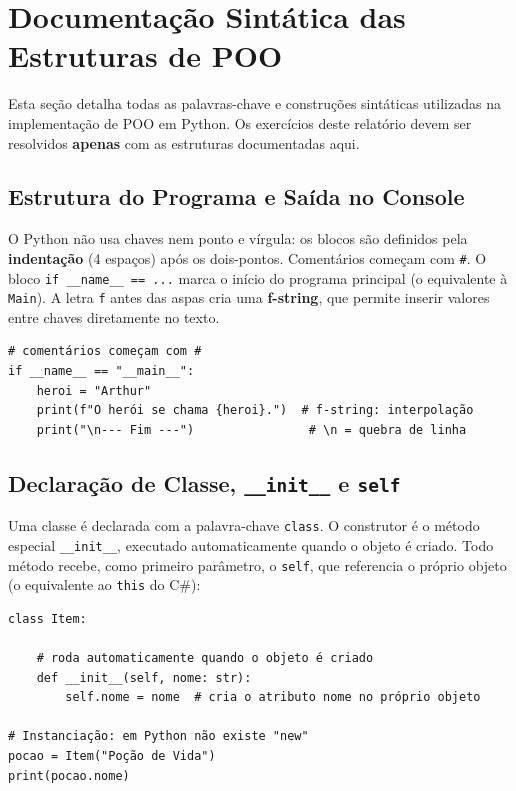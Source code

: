 \section{Documentação Sintática das Estruturas de POO}

Esta seção detalha todas as palavras-chave e construções sintáticas utilizadas na implementação
de POO em Python. Os exercícios deste relatório devem ser resolvidos \textbf{apenas} com as
estruturas documentadas aqui.

\subsection{Estrutura do Programa e Saída no Console}

O Python não usa chaves nem ponto e vírgula: os blocos são definidos pela \textbf{indentação}
(4 espaços) após os dois-pontos. Comentários começam com \texttt{\#}. O bloco
\texttt{if \_\_name\_\_ == ...} marca o início do programa principal (o equivalente à
\texttt{Main}). A letra \texttt{f} antes das aspas cria uma \textbf{f-string}, que permite
inserir valores entre chaves diretamente no texto.

\begin{lstlisting}[style=python]
# comentários começam com #
if __name__ == "__main__":
    heroi = "Arthur"
    print(f"O herói se chama {heroi}.")  # f-string: interpolação
    print("\n--- Fim ---")                # \n = quebra de linha
\end{lstlisting}

\subsection{Declaração de Classe, \texttt{\_\_init\_\_} e \texttt{self}}

Uma classe é declarada com a palavra-chave \texttt{class}. O construtor é o método especial
\texttt{\_\_init\_\_}, executado automaticamente quando o objeto é criado. Todo método recebe,
como primeiro parâmetro, o \texttt{self}, que referencia o próprio objeto (o equivalente ao
\texttt{this} do C\#):

\begin{lstlisting}[style=python]
class Item:

    # roda automaticamente quando o objeto é criado
    def __init__(self, nome: str):
        self.nome = nome  # cria o atributo nome no próprio objeto

# Instanciação: em Python não existe "new"
pocao = Item("Poção de Vida")
print(pocao.nome)
\end{lstlisting}

